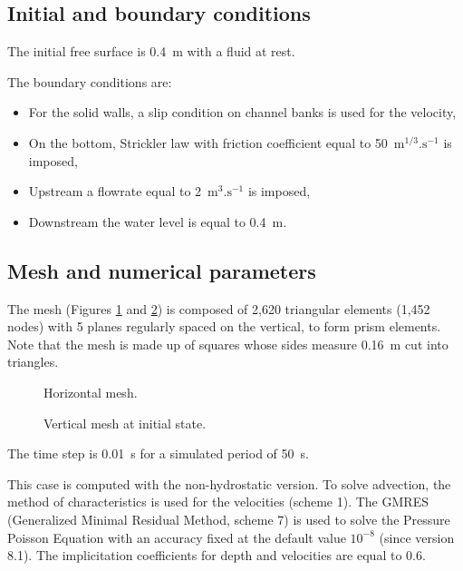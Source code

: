 \subsection{Initial and boundary conditions}

\bigskip
The initial free surface is 0.4~m with a fluid at rest.

\bigskip
The boundary conditions are:
\begin{itemize}
\item For the solid walls, a slip condition on channel banks is used for the velocity,
\item On the bottom, Strickler law with friction coefficient equal to
50~$\text{m}^{1/3}.\text{s}^{-1}$ is imposed,
\item Upstream a flowrate equal to 2~$\text{m}^{3}.\text{s}^{-1}$ is imposed,
\item Downstream the water level is equal to 0.4~m.
\end{itemize}

\subsection{Mesh and numerical parameters}
\bigskip
The mesh (Figures \ref{t3d:bump:fig:meshH} and \ref{t3d:bump:fig:meshV})  
is composed of 2,620 triangular elements (1,452 nodes) with 5 planes  
regularly spaced on the vertical, to form prism elements.
Note that the mesh is made up of squares whose sides measure 0.16~m cut into
triangles. 

\begin{figure}[!htbp]
 \centering
 \caption{Horizontal mesh.}
 \label{t3d:bump:fig:meshH}
\end{figure}
\begin{figure}[!htbp]
 \centering
 \caption{Vertical mesh  at initial state.}
 \label{t3d:bump:fig:meshV}
\end{figure}
\bigskip
The time step is 0.01~s for a simulated period of 50~s. 

\bigskip
This case is computed with the non-hydrostatic version.
To solve advection, the method of characteristics is used for the velocities (scheme 1).
The GMRES (Generalized Minimal Residual Method, scheme 7) is used to solve 
the Pressure Poisson Equation with an accuracy fixed at the default value
$10^{-8}$  (since version 8.1).
The implicitation coefficients for depth and velocities are equal to 0.6. 

